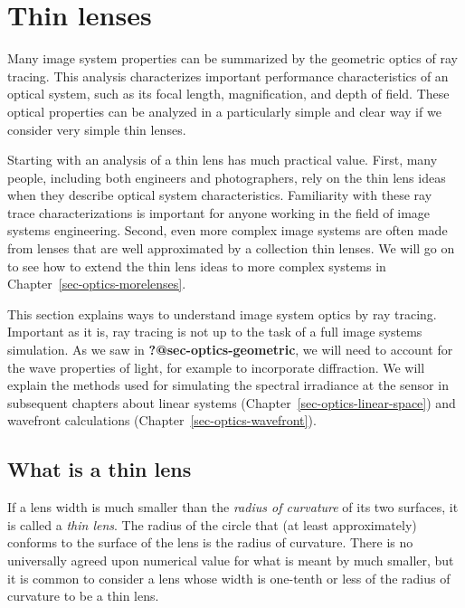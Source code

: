 \documentclass[
  letterpaper,
]{book}
\begin{document}
\chapter{Thin lenses}\label{sec-optics-thinlens}

Many image system properties can be summarized by the geometric optics
of ray tracing. This analysis characterizes important performance
characteristics of an optical system, such as its focal length,
magnification, and depth of field. These optical properties can be
analyzed in a particularly simple and clear way if we consider very
simple thin lenses.

Starting with an analysis of a thin lens has much practical value.
First, many people, including both engineers and photographers, rely on
the thin lens ideas when they describe optical system characteristics.
Familiarity with these ray trace characterizations is important for
anyone working in the field of image systems engineering. Second, even
more complex image systems are often made from lenses that are well
approximated by a collection thin lenses. We will go on to see how to
extend the thin lens ideas to more complex systems in
Chapter~\ref{sec-optics-morelenses}.

This section explains ways to understand image system optics by ray
tracing. Important as it is, ray tracing is not up to the task of a full
image systems simulation. As we saw in \textbf{?@sec-optics-geometric},
we will need to account for the wave properties of light, for example to
incorporate diffraction. We will explain the methods used for simulating
the spectral irradiance at the sensor in subsequent chapters about
linear systems (Chapter~\ref{sec-optics-linear-space}) and wavefront
calculations (Chapter~\ref{sec-optics-wavefront}).

\section{What is a thin lens}\label{sec-optics-thinlensdefined}

If a lens width is much smaller than the \emph{radius of curvature} of
its two surfaces, it is called a \emph{thin lens}. The radius of the
circle that (at least approximately) conforms to the surface of the lens
is the radius of curvature. There is no universally agreed upon
numerical value for what is meant by much smaller, but it is common to
consider a lens whose width is one-tenth or less of the radius of
curvature to be a thin lens.
\end{document}
